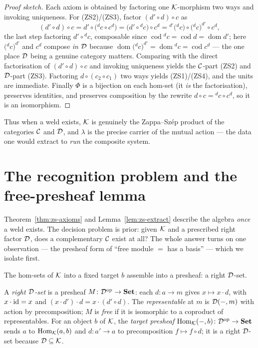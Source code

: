 \begin{proof}[Proof sketch]
Each axiom is obtained by factoring one $\mathcal{K}$-morphism two ways and invoking
uniqueness. For (ZS2)/(ZS3), factor $(d'\circ d)\circ c$ as
\[
  (d'\circ d)\circ c
  = d'\circ\bigl({}^{d}c\circ c^{d}\bigr)
  = \bigl(d'\circ{}^{d}c\bigr)\circ c^{d}
  = {}^{d'}\!\bigl({}^{d}c\bigr)\circ\bigl({}^{d}c\bigr)^{d'}\!\circ c^{d},
\]
the last step factoring $d'\circ{}^{d}c$, composable since
$\operatorname{cod}{}^{d}c=\operatorname{cod} d=\operatorname{dom} d'$; here
$\bigl({}^{d}c\bigr)^{d'}$ and $c^{d}$ compose \emph{in $\mathcal{D}$} because
$\operatorname{dom}\bigl({}^{d}c\bigr)^{d'}=\operatorname{dom}{}^{d}c=
\operatorname{cod} c^{d}$ --- the one place $\mathcal{D}$ being a genuine category matters.
Comparing with the direct factorisation of $(d'\circ d)\circ c$ and invoking
uniqueness yields the $\mathcal{C}$-part (ZS2) and $\mathcal{D}$-part (ZS3). Factoring $d\circ(c_2
\circ c_1)$ two ways yields (ZS1)/(ZS4), and the units are immediate. Finally
$\Phi$ is a bijection on each hom-set (it \emph{is} the factorisation), preserves
identities, and preserves composition by the rewrite $d\circ c={}^{d}c\circ c^{d}$,
so it is an isomorphism.
\end{proof}

Thus when a weld exists, $\mathcal{K}$ is genuinely the Zappa--Sz\'ep product of the
categories $\mathcal{C}$ and $\mathcal{D}$, and $\lambda$ is the precise carrier of the mutual
action --- the data one would extract to \emph{run} the composite system.

\section{The recognition problem and the free-presheaf lemma}\label{sec:zs-lemma}

Theorem~\ref{thm:zs-axioms} and Lemma~\ref{lem:zs-extract} describe the algebra
\emph{once} a weld exists. The decision problem is prior: given $\mathcal{K}$ and a
prescribed right factor $\mathcal{D}$, does a complementary $\mathcal{C}$ exist at all? The whole
answer turns on one observation --- the presheaf form of ``free module $=$ has a
basis'' --- which we isolate first.

The hom-sets of $\mathcal{K}$ into a fixed target $b$ assemble into a presheaf: a right
$\mathcal{D}$-set.

\begin{definition}\label{def:zs-free}
A \emph{right $\mathcal{D}$-set} is a presheaf $M\colon\mathcal{D}^{\mathrm{op}}\to\mathbf{Set}$: each $d\colon a\to
m$ gives $x\mapsto x\cdot d$, with $x\cdot\mathrm{id}=x$ and $(x\cdot d')\cdot d=x\cdot
(d'\circ d)$. The \emph{representable} at $m$ is $\mathcal{D}(-,m)$ with action by
precomposition; $M$ is \emph{free} if it is isomorphic to a coproduct of
representables. For an object $b$ of $\mathcal{K}$, the \emph{target presheaf}
$\mathrm{Hom}_{\mathcal{K}}(-,b)\colon\mathcal{D}^{\mathrm{op}}\to\mathbf{Set}$ sends $a$ to $\mathrm{Hom}_{\mathcal{K}}(a,b)$ and $d\colon a'\to
a$ to precomposition $f\mapsto f\circ d$; it is a right $\mathcal{D}$-set because $\mathcal{D}
\subseteq\mathcal{K}$.
\end{definition}

